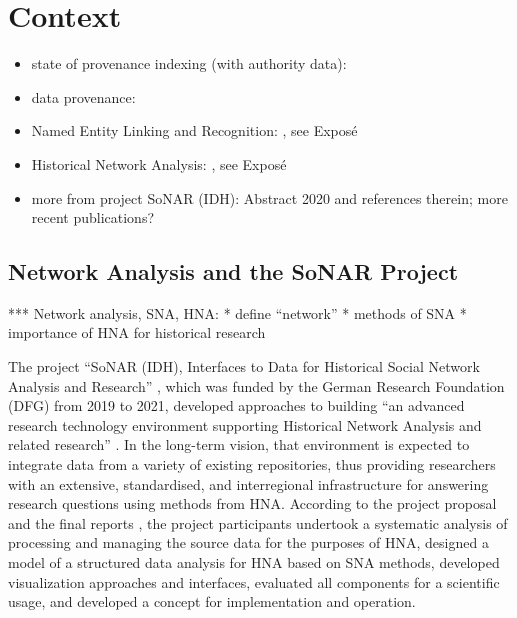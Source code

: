 \chapter{Context}
\label{chap:rel_work}
\label{chap:context}


\begin{itemize}
  \item
    state of provenance indexing (with authority data): \autocite{Hakelberg2016}
  \item
    data provenance: \autocite{Eckert2012}
  \item
    Named Entity Linking and Recognition: \autocite{Menzel2021, Meiners2022}, see Exposé
  \item 
    Historical Network Analysis: \autocite{Menzel2020}, see Exposé
  \item
    more from project SoNAR (IDH): Abstract 2020 and references therein; more recent publications?
\end{itemize}

\section{Network Analysis and the SoNAR Project}
\label{sec:HNA+SoNAR}

*** Network analysis, SNA, HNA:
* define \enquote{network}
* methods of SNA
* importance of HNA for historical research

The project \enquote{SoNAR (IDH),
Interfaces to Data for Historical Social Network Analysis
and Research} \autocite{Bludau2020,Menzel2020,SoNAR},
which was funded by the German Research Foundation (DFG)
from 2019 to 2021,
developed approaches to building 
\enquote{an advanced research technology environment
supporting Historical Network Analysis and related research} \autocite{SoNAR}.
In the long-term vision, that environment is expected to
integrate data from a variety of existing repositories,
thus providing researchers with an extensive,
standardised, and interregional infrastructure for answering research questions
using methods from HNA.
According to the project proposal and the final reports \autocite{SoNARreports},
the project participants undertook
a systematic analysis of processing and managing the source data
for the purposes of HNA,
designed a model of a structured data analysis for HNA based on SNA methods,
developed visualization approaches and interfaces,
evaluated all components for a scientific usage,
and developed a concept for implementation and operation.

